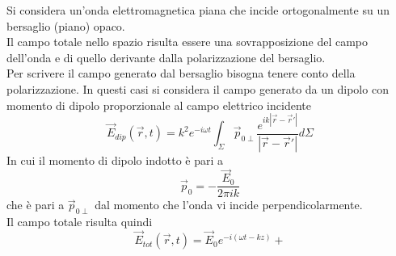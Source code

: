 \documentclass[twoside]{article}
\begin{document}
Si considera un'onda elettromagnetica piana che incide ortogonalmente su un bersaglio (piano) opaco.
\\
Il campo totale nello spazio risulta essere una sovrapposizione del campo dell'onda e di quello derivante dalla polarizzazione del bersaglio.
\\
Per scrivere il campo generato dal bersaglio bisogna tenere conto della polarizzazione.
In questi casi si considera il campo generato da un dipolo con momento di dipolo proporzionale al campo elettrico incidente
\begin{equation}
    \vec{E}_{dip}(\vec{r},t)=k^2e^{-i\omega t}\int_\Sigma \vec{p}_{0\perp} \frac{e^{ik|\vec{r}-\vec{r}'|}}{|\vec{r}-\vec{r}'|}d\Sigma 
\end{equation}
In cui il momento di dipolo indotto è pari a
\begin{equation}
    \vec{p}_0=-\frac{\vec{E}_0}{2\pi i k}
\end{equation}
che è pari a $\vec{p}_{0\perp}$ dal momento che l'onda vi incide perpendicolarmente.
\\
Il campo totale risulta quindi
\begin{equation}
    \vec{E}_{tot}(\vec{r},t)=\vec{E}_0 e^{-i(\omega t -kz)}+
\end{equation}
\end{document}

